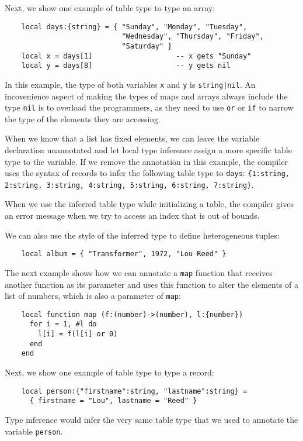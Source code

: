 Next, we show one example of table type to type an array:
\begin{verbatim}
    local days:{string} = { "Sunday", "Monday", "Tuesday",
                            "Wednesday", "Thursday", "Friday",
                            "Saturday" }
    local x = days[1]                    -- x gets "Sunday"
    local y = days[8]                    -- y gets nil
\end{verbatim}

In this example, the type of both variables \texttt{x} and \texttt{y}
is \texttt{string|nil}.
An incovenience aspect of making the types of maps and arrays always
include the type \texttt{nil} is to overload the programmers,
as they need to use \texttt{or} or \texttt{if} to narrow the type of
the elements they are accessing. 

When we know that a list has fixed elements, we can leave the
variable declaration unannotated and let local type inference assign
a more specific table type to the variable.
If we remove the annotation in this example, the compiler uses the
syntax of records to infer the following table type to \texttt{days}:
\texttt{\{1:string, 2:string, 3:string, 4:string, 5:string, 6:string, 7:string\}}.

When we use the inferred table type while initializing a table, the
compiler gives an error message when we try to access an index that
is out of bounds.

We can also use the style of the inferred type to define heterogeneous
tuples:
\begin{verbatim}
    local album = { "Transformer", 1972, "Lou Reed" }
\end{verbatim}

The next example shows how we can annotate a \texttt{map} function
that receives another function as its parameter and uses this
function to alter the elements of a list of numbers, which is
also a parameter of \texttt{map}:
\begin{verbatim}
    local function map (f:(number)->(number), l:{number})
      for i = 1, #l do
        l[i] = f(l[i] or 0)
      end
    end
\end{verbatim}

Next, we show one example of table type to type a record:
\begin{verbatim}
    local person:{"firstname":string, "lastname":string} =
      { firstname = "Lou", lastname = "Reed" } 
\end{verbatim}

Type inference would infer the very same table type that we used to
annotate the variable \texttt{person}.

